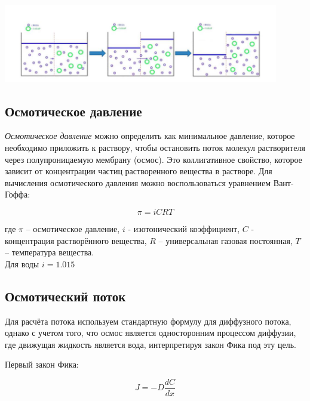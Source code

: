 \documentclass{article}
\begin{document}
            \includegraphics[width=0.9\textwidth]{Osmos.png}
        
        \newpage
        \subsection*{Осмотическое давление}
            \hspace*{4mm}\textit{Осмотическое давление} можно определить как минимальное давление, которое необходимо
            приложить к раствору, чтобы остановить поток молекул растворителя через
            полупроницаемую мембрану (осмос). Это коллигативное свойство, которое
            зависит от концентрации частиц растворенного вещества в растворе.
            Для вычисления осмотического давления можно воспользоваться уравнением Вант-Гоффа:

            \begin{equation}
                \pi = iCRT    
            \end{equation}
            
            где $\pi$ – осмотическое давление,
            $i$ - изотонический коэффициент,
            $C$ - концентрация растворённого вещества,
            $R$ – универсальная газовая постоянная,
            $T$ – температура вещества. \\

            Для воды $i = 1.015$

        \subsection*{Осмотический поток}
            \hspace*{4mm}Для расчёта потока используем стандартную формулу для диффузного потока, однако с учетом того, что осмос
            является односторонним процессом диффузии, где движущая жидкость является
            вода, интерпретируя закон Фика под эту цель.

            \begin{center}
                Первый закон Фика:

                \begin{equation}
                    J = -D\frac{dC}{dx}    
                \end{equation}
            \end{center}
            
\end{document}
